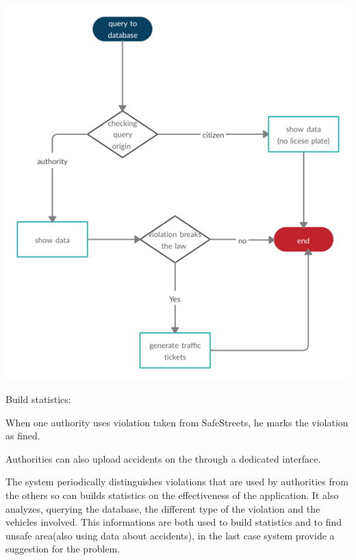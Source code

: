 \documentclass[a4paper, hidelinks, 12pt]{report}
\begin{document}
    \begin{center}
        \includegraphics[]{assets/queryDb.png}\\[1.6 cm]
    \end{center}

	    Build statistics:

	    When one authority uses violation taken from SafeStreets, he marks the violation as fined.

	    Authorities can also upload accidents on the through a dedicated interface.

	    The system periodically distinguishes violations that are used by authorities from the others so can builds statistics on the effectiveness of the application. It also analyzes, querying the database, the different type of the violation and the vehicles involved. This informations are both used to build statistics and to find unsafe area(also using data about accidents), in the last case system provide a suggestion for the problem.
\end{document}
